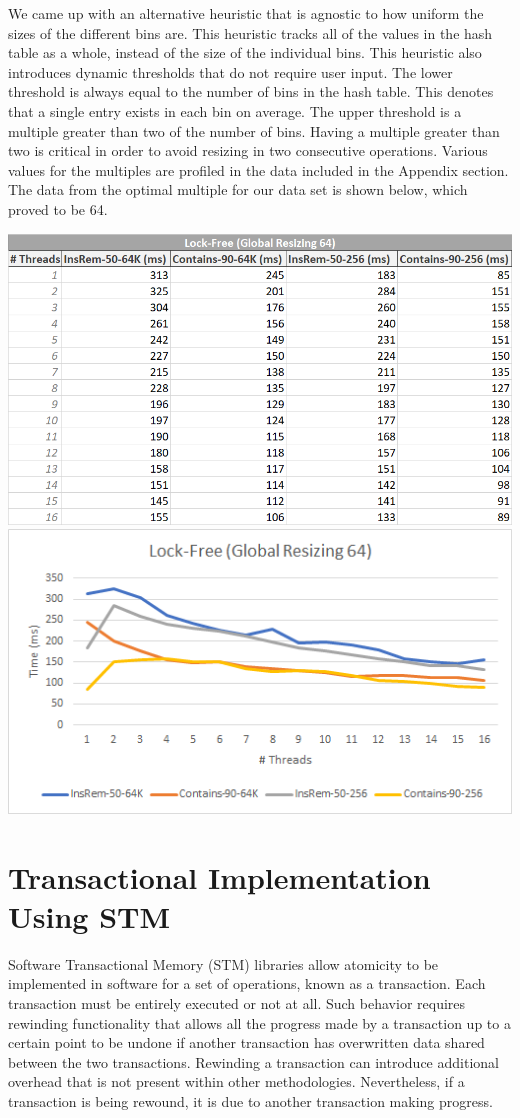 \documentclass[11pt]{article} %
\begin{document}
We came up with an alternative heuristic that is agnostic to how uniform the sizes of the different bins are. This heuristic tracks all of the values in the hash table as a whole, instead of the size of the individual bins. This heuristic also introduces dynamic thresholds that do not require user input. The lower threshold is always equal to the number of bins in the hash table. This denotes that a single entry exists in each bin on average. The upper threshold is a multiple greater than two of the number of bins. Having a multiple greater than two is critical in order to avoid resizing in two consecutive operations. Various values for the multiples are profiled in the data included in the Appendix section. The data from the optimal multiple for our data set is shown below, which proved to be 64.

\bigskip
\includegraphics[width=0.5\linewidth]{TableF.png}
\includegraphics[width=0.5\linewidth]{GraphF.png}

\section{Transactional Implementation Using STM}

Software Transactional Memory (STM) libraries allow atomicity to be implemented in software for a set of operations, known as a transaction. Each transaction must be entirely executed or not at all. Such behavior requires rewinding functionality that allows all the progress made by a transaction up to a certain point to be undone if another transaction has overwritten data shared between the two transactions. Rewinding a transaction can introduce additional overhead that is not present within other methodologies. Nevertheless, if a transaction is being rewound, it is due to another transaction making progress.
\end{document}
